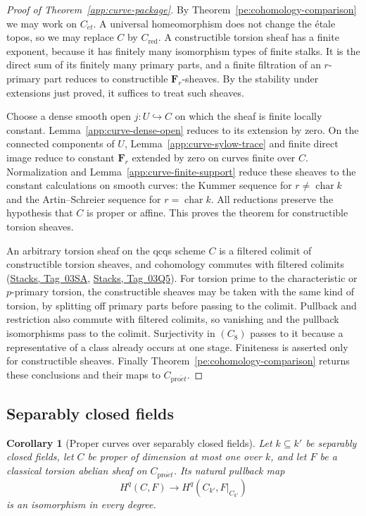 \documentclass[11pt,a4paper]{article}
\numberwithin{equation}{section}
\newtheorem{corollary}[theorem]{Corollary}
\theoremstyle{definition}
\theoremstyle{remark}
\newcommand{\et}{\acute{e}t}
\newcommand{\proet}{\mathrm{pro}\acute{e}t}
\newcommand{\stacks}[1]{\href{https://stacks.math.columbia.edu/tag/#1}{\textnormal{Stacks, Tag~#1}}}
\begin{document}
\begin{proof}[Proof of Theorem~\ref{app:curve-package}]
By Theorem~\ref{pe:cohomology-comparison} we may work on $C_{\et}$.  A
universal homeomorphism does not change the \'etale topos, so we may
replace $C$ by $C_{\mathrm{red}}$.  A constructible torsion sheaf has a
finite exponent, because it has finitely many isomorphism types of
finite stalks.  It is the direct sum of its finitely many primary
parts, and a finite filtration of an $r$-primary part reduces to
constructible $\mathbf F_r$-sheaves.  By the stability under extensions
just proved, it suffices to treat such sheaves.

Choose a dense smooth open $j\colon U\hookrightarrow C$ on which the
sheaf is finite locally constant.  Lemma~\ref{app:curve-dense-open}
reduces to its extension by zero.  On the connected components of $U$,
Lemma~\ref{app:curve-sylow-trace} and finite direct image reduce to
constant $\mathbf F_r$ extended by zero on curves finite over $C$.
Normalization and Lemma~\ref{app:curve-finite-support} reduce these
sheaves to the constant calculations on smooth curves: the Kummer
sequence for $r\ne\operatorname{char}k$ and the Artin--Schreier
sequence for $r=\operatorname{char}k$.  All reductions preserve the
hypothesis that $C$ is proper or affine.  This proves the theorem for
constructible torsion sheaves.

An arbitrary torsion sheaf on the qcqs scheme $C$ is a filtered
colimit of constructible torsion sheaves, and cohomology commutes with
filtered colimits (\stacks{03SA}, \stacks{03Q5}).  For torsion prime to
the characteristic or $p$-primary torsion, the constructible sheaves
may be taken with the same kind of torsion, by splitting off primary
parts before passing to the colimit.  Pullback and restriction also
commute with filtered colimits, so vanishing and the pullback
isomorphisms pass to the colimit.  Surjectivity in $(C_8)$ passes to
it because a representative of a class already occurs at one stage.
Finiteness is asserted only for constructible sheaves.  Finally
Theorem~\ref{pe:cohomology-comparison} returns these conclusions and
their maps to $C_{\proet}$.
\end{proof}

\subsection{Separably closed fields}

\begin{corollary}[Proper curves over separably closed fields]
\label{app:curve-invariance}
Let $k\subseteq k'$ be separably closed fields, let $C$ be proper
of dimension at most one over $k$, and let $F$ be a classical
torsion abelian sheaf on $C_{\proet}$.  Its natural pullback map
\[
 H^q(C,F)\longrightarrow H^q(C_{k'},F|_{C_{k'}})
\]
is an isomorphism in every degree.
\end{corollary}
\end{document}
